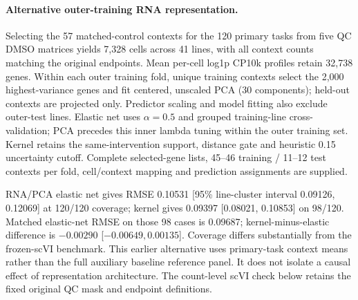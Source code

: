 \documentclass[a4paper,fleqn]{cas-sc}
\begin{document}
\paragraph{Alternative outer-training RNA representation.}
Selecting the 57 matched-control contexts for the 120 primary tasks from five QC DMSO matrices yields 7,328 cells across 41 lines, with all context counts matching the original endpoints. Mean per-cell log1p CP10k profiles retain 32,738 genes. Within each outer training fold, unique training contexts select the 2,000 highest-variance genes and fit centered, unscaled PCA (30 components); held-out contexts are projected only. Predictor scaling and model fitting also exclude outer-test lines. Elastic net uses $\alpha=0.5$ and grouped training-line cross-validation; PCA precedes this inner lambda tuning within the outer training set. Kernel retains the same-intervention support, distance gate and heuristic 0.15 uncertainty cutoff. Complete selected-gene lists, 45--46 training / 11--12 test contexts per fold, cell/context mapping and prediction assignments are supplied.

RNA/PCA elastic net gives RMSE 0.10531 [95\% line-cluster interval 0.09126, 0.12069] at 120/120 coverage; kernel gives 0.09397 [0.08021, 0.10853] on 98/120. Matched elastic-net RMSE on those 98 cases is 0.09687; kernel-minus-elastic difference is $-0.00290$ [$-0.00649,0.00135$]. Coverage differs substantially from the frozen-scVI benchmark. This earlier alternative uses primary-task context means rather than the full auxiliary baseline reference panel. It does not isolate a causal effect of representation architecture. The count-level scVI check below retains the fixed original QC mask and endpoint definitions.
\end{document}
